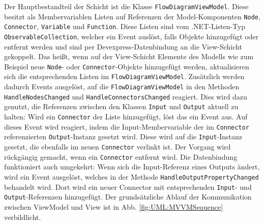 Der Hauptbestandteil der Schicht ist die Klasse \texttt{FlowDiagramViewModel}. Diese besitzt als Membervariablen Listen auf Referenzen der Model-Komponenten \texttt{Node}, \texttt{Connector}, \texttt{Variable} und \texttt{Function}. Diese Listen sind vom .NET-Listen-Typ \texttt{ObservableCollection}, welcher ein Event auslöst, falls Objekte hinzugefügt oder entfernt werden und sind per Devexpress-Datenbindung an die View-Schicht gekoppelt. Das heißt, wenn auf der View-Schicht Elemente des Modells wie zum Beispiel neue \texttt{Node}- oder \texttt{Connector}-Objekte hinzugefügt werden, aktualisieren sich die entsprechenden Listen im \texttt{FlowDiagramViewModel}. Zusätzlich werden dadurch Events ausgelöst, auf die \texttt{FlowDiagramViewModel} in den Methoden \texttt{HandleNodesChanged} und \texttt{HandleConnectorsChanged} reagiert. Dies wird dazu genutzt, die Referenzen zwischen den Klassen \texttt{Input} und \texttt{Output} aktuell zu halten: Wird ein \texttt{Connector} der Liste hinzugefügt, löst das ein Event aus. Auf dieses Event wird reagiert, indem die Input-Membervariable der im \texttt{Connector} referenzierten \texttt{Output}-Instanz gesetzt wird. 
\newpage
\noindent Diese wird auf die \texttt{Input}-Instanz gesetzt, die ebenfalls im neuen \texttt{Connector} verlinkt ist. Der Vorgang wird rückgängig gemacht, wenn ein \texttt{Connector} entfernt wird. Die Datenbindung funktioniert auch umgekehrt: Wenn sich die Input-Referenz eines Outputs ändert, wird ein Event ausgelöst, welches in der Methode \texttt{HandleOutputPropertyChanged} behandelt wird. Dort wird ein neuer Connector mit entsprechenden \texttt{Input}- und \texttt{Output}-Referenzen hinzugefügt. Der grundsätzliche Ablauf der Kommunikation zwischen ViewModel und View ist in Abb. \ref{fig:UML:MVVMSequence} verbildlicht.
